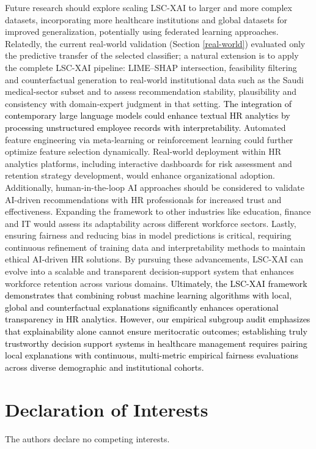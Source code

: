 \documentclass[a4paper,fleqn]{cas-sc}
\begin{document}
Future research should explore scaling LSC-XAI to larger and more complex datasets, incorporating more healthcare institutions and global datasets for improved generalization, potentially using federated learning approaches. Relatedly, the current real-world validation (Section \ref{real-world}) evaluated only the predictive transfer of the selected classifier; a natural extension is to apply the complete LSC-XAI pipeline: LIME–SHAP intersection, feasibility filtering and counterfactual generation to real-world institutional data such as the Saudi medical-sector subset and to assess recommendation stability, plausibility and consistency with domain-expert judgment in that setting. \textcolor{black}{The integration of contemporary large language models could enhance textual HR analytics by processing unstructured employee records with interpretability.} Automated feature engineering via meta-learning or reinforcement learning could further optimize feature selection dynamically. Real-world deployment within HR analytics platforms, including interactive dashboards for risk assessment and retention strategy development, would enhance organizational adoption. Additionally, human-in-the-loop AI approaches should be considered to validate AI-driven recommendations with HR professionals for increased trust and effectiveness. Expanding the framework to other industries like education, finance and IT would assess its adaptability across different workforce sectors. Lastly, ensuring fairness and reducing bias in model predictions is critical, requiring continuous refinement of training data and interpretability methods to maintain ethical AI-driven HR solutions. By pursuing these advancements, LSC-XAI can evolve into a scalable and transparent decision-support system that enhances workforce retention across various domains.
\textcolor{black}{Ultimately, the LSC-XAI framework demonstrates that combining robust machine learning algorithms with local, global and counterfactual explanations significantly enhances operational transparency in HR analytics. However, our empirical subgroup audit emphasizes that explainability alone cannot ensure meritocratic outcomes; establishing truly trustworthy decision support systems in healthcare management requires pairing local explanations with continuous, multi-metric empirical fairness evaluations across diverse demographic and institutional cohorts.
}

\section*{Declaration of Interests}
The authors declare no competing interests.
\end{document}
